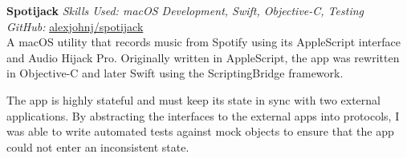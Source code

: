 \textbf{Spotijack}  \newline
\textit{Skills Used: macOS Development, Swift, Objective-C, Testing}\\
\textit{GitHub:} \href{https://github.com/\myweb/spotijack}{alexjohnj/spotijack}\\
A macOS utility that records music from Spotify using its AppleScript interface
and Audio Hijack Pro. Originally written in AppleScript, the app was rewritten
in Objective-C and later Swift using the ScriptingBridge framework.

The app is highly stateful and must keep its state in sync with two external
applications. By abstracting the interfaces to the external apps into protocols,
I was able to write automated tests against mock objects to ensure that the app
could not enter an inconsistent state.

